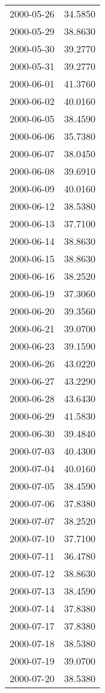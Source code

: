 \begin{tabular}{lr}
2000-05-26 &     34.5850 \\
2000-05-29 &     38.8630 \\
2000-05-30 &     39.2770 \\
2000-05-31 &     39.2770 \\
2000-06-01 &     41.3760 \\
2000-06-02 &     40.0160 \\
2000-06-05 &     38.4590 \\
2000-06-06 &     35.7380 \\
2000-06-07 &     38.0450 \\
2000-06-08 &     39.6910 \\
2000-06-09 &     40.0160 \\
2000-06-12 &     38.5380 \\
2000-06-13 &     37.7100 \\
2000-06-14 &     38.8630 \\
2000-06-15 &     38.8630 \\
2000-06-16 &     38.2520 \\
2000-06-19 &     37.3060 \\
2000-06-20 &     39.3560 \\
2000-06-21 &     39.0700 \\
2000-06-23 &     39.1590 \\
2000-06-26 &     43.0220 \\
2000-06-27 &     43.2290 \\
2000-06-28 &     43.6430 \\
2000-06-29 &     41.5830 \\
2000-06-30 &     39.4840 \\
2000-07-03 &     40.4300 \\
2000-07-04 &     40.0160 \\
2000-07-05 &     38.4590 \\
2000-07-06 &     37.8380 \\
2000-07-07 &     38.2520 \\
2000-07-10 &     37.7100 \\
2000-07-11 &     36.4780 \\
2000-07-12 &     38.8630 \\
2000-07-13 &     38.4590 \\
2000-07-14 &     37.8380 \\
2000-07-17 &     37.8380 \\
2000-07-18 &     38.5380 \\
2000-07-19 &     39.0700 \\
2000-07-20 &     38.5380 \\

\end{tabular}
